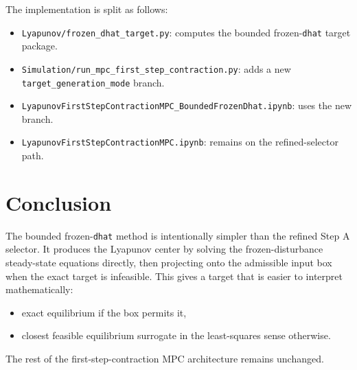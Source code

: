 \documentclass[11pt]{article}
\begin{document}
The implementation is split as follows:
\begin{itemize}
\item \texttt{Lyapunov/frozen\_dhat\_target.py}: computes the bounded frozen-\texttt{dhat} target package.
\item \texttt{Simulation/run\_mpc\_first\_step\_contraction.py}: adds a new \texttt{target\_generation\_mode} branch.
\item \texttt{LyapunovFirstStepContractionMPC\_BoundedFrozenDhat.ipynb}: uses the new branch.
\item \texttt{LyapunovFirstStepContractionMPC.ipynb}: remains on the refined-selector path.
\end{itemize}

\section{Conclusion}

The bounded frozen-\texttt{dhat} method is intentionally simpler than the refined Step A selector. It produces the Lyapunov center by solving the frozen-disturbance steady-state equations directly, then projecting onto the admissible input box when the exact target is infeasible. This gives a target that is easier to interpret mathematically:
\begin{itemize}
\item exact equilibrium if the box permits it,
\item closest feasible equilibrium surrogate in the least-squares sense otherwise.
\end{itemize}

The rest of the first-step-contraction MPC architecture remains unchanged.
\end{document}
